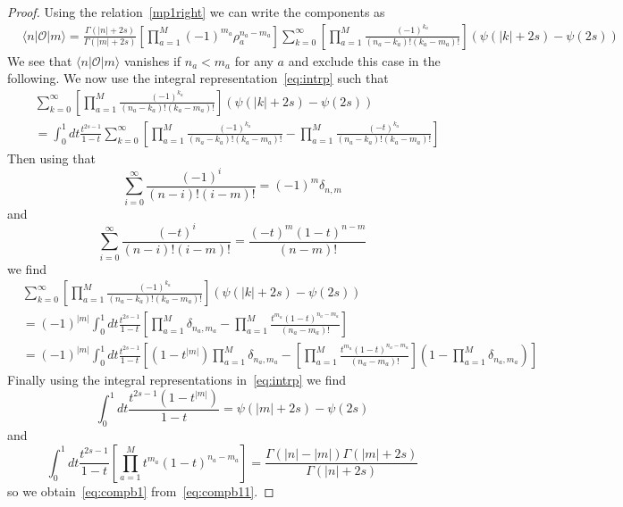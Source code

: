 \documentclass[11pt]{article}
\numberwithin{equation}{section}
\newcommand{\M}{M}
\begin{document}
\begin{proof}
Using the relation~\eqref{mp1right} we can write the components as
\begin{equation}\label{eq:compb11}
\begin{split}
&\langle n|
 \mathcal{O}|m\rangle
  =\frac{\Gamma(|n|+2s)}{\Gamma(|m|+2s)}\left[\prod_{a=1}^{\M}(-1)^{m_a}\rho_{a}^{n_{a}-m_a}\right]\sum_{k=0}^\infty \left[\prod_{a=1}^{\M}\frac{(-1)^{k_{a}}}{(n_{a}-k_a)!(k_{a}-m_a)! }\right]\left(\psi(|k|+2s)-\psi(2s)\right )
 \end{split}
\end{equation}
We see that $\langle n|
 \mathcal{O}|m\rangle$ vanishes if $n_a<m_a$  for any $a$ and exclude this case in the following.
We now use the integral representation~\eqref{eq:intrp} such that
\begin{equation}
 \begin{split}
  &\sum_{k=0}^\infty \left[\prod_{a=1}^{\M}\frac{(-1)^{k_{a}}}{(n_{a}-k_a)!(k_{a}-m_a)! }\right]\left(\psi(|k|+2s)-\psi(2s)\right )\\&=\int_0^1 dt\frac{t^{2s-1}}{1-t}\sum_{k=0}^\infty \left[\prod_{a=1}^{\M}\frac{(-1)^{k_{a}}}{(n_{a}-k_a)!(k_{a}-m_a)! }-\prod_{a=1}^{\M}\frac{(-t)^{k_{a}}}{(n_{a}-k_a)!(k_{a}-m_a)! }\right]
 \end{split}
\end{equation}
Then using that
\begin{equation}
\sum_{i=0}^\infty \frac{(-1)^{i}}{(n-i)!(i-m)! }=(-1)^m\delta _{n,m}
\end{equation}
and
\begin{equation}
\sum_{i=0}^\infty \frac{(-t)^{i}}{(n-i)!(i-m)! }=\frac{(-t)^m (1-t)^{n-m}}{(n-m)!}
\end{equation}
we find
\begin{equation}
 \begin{split}
  &\sum_{k=0}^\infty \left[\prod_{a=1}^{\M}\frac{(-1)^{k_{a}}}{(n_{a}-k_a)!(k_{a}-m_a)! }\right]\left(\psi(|k|+2s)-\psi(2s)\right )\\&=(-1)^{|m|}\int_0^1 dt\frac{t^{2s-1}}{1-t} \left[\prod_{a=1}^{\M}  \delta _{n_a,m_a} -\prod_{a=1}^{\M}\frac{t^{m_a} (1-t)^{n_a-m_a}}{(n_a-m_a)!}\right]\\
  &=(-1)^{|m|}\int_0^1 dt\frac{t^{2s-1}}{1-t}\left[(1-t^{|m|}) \prod_{a=1}^{\M}\delta _{n_a,m_a}-\left[\prod_{a=1}^{\M}\frac{t^{m_a} (1-t)^{n_a-m_a}}{(n_a-m_a)!}\right]\left(1-\prod_{a=1}^{\M}\delta _{n_a,m_a}\right)\right]
 \end{split}
\end{equation}
Finally using the integral representations in~\eqref{eq:intrp} we find
\begin{equation}
 \int_0^1 dt\frac{t^{2s-1}(1-t^{|m|})}{1-t} =\psi(|m|+2s)-\psi(2s)
\end{equation}
and
\begin{equation}
 \int_0^1 dt\frac{t^{2s-1}}{1-t}  \left[\prod_{a=1}^{\M}t^{m_a} (1-t)^{n_a-m_a}\right]=\frac{ \Gamma (|n|-|m|) \Gamma (|m|+2 s)}{\Gamma (|n|+2 s)}
\end{equation}
so we obtain~\eqref{eq:compb1} from~\eqref{eq:compb11}.
\end{proof}
\end{document}
